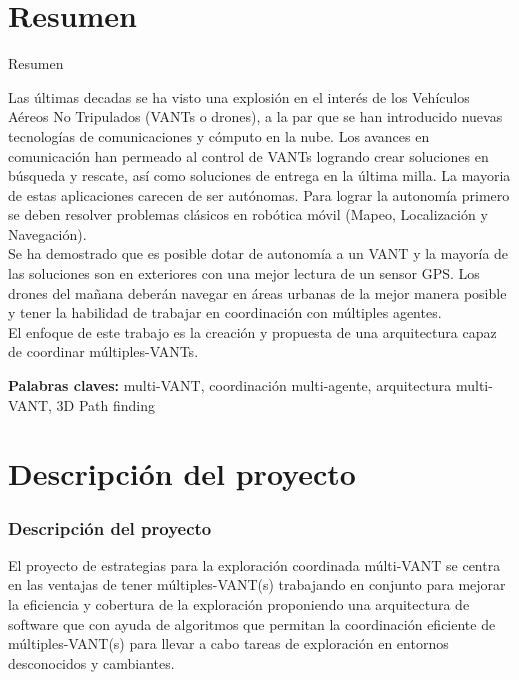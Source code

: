 \documentclass[
	11pt, %
]{beamer}
\begin{document}


\section{Resumen}

\begin{frame}
  
  \begin{block}{Resumen}

    {\footnotesize Las últimas decadas se ha visto una explosión en el interés de los Vehículos Aéreos No Tripulados (VANTs o drones), a la par que se han introducido nuevas tecnologías de comunicaciones y cómputo en la nube. Los avances en comunicación han permeado al control de VANTs logrando crear soluciones en búsqueda y rescate, así como soluciones de entrega en la última milla. La mayoria de estas aplicaciones carecen de ser autónomas. Para lograr la autonomía primero se deben resolver problemas clásicos en robótica móvil (Mapeo, Localización y Navegación).\\
      
    Se ha demostrado que es posible dotar de autonomía a un VANT y la mayoría de las soluciones son en exteriores con una mejor lectura de un sensor GPS. Los drones del mañana deberán navegar en áreas urbanas de la mejor manera posible y tener la habilidad de trabajar en coordinación con múltiples agentes.\\
    
    El enfoque de este trabajo es la creación y propuesta de una arquitectura capaz de coordinar múltiples-VANTs.\\
    }
  \medskip 
  
  \noindent \textbf{Palabras claves:} multi-VANT, coordinación multi-agente, arquitectura multi-VANT, 3D Path finding
  
  \end{block}
  
\end{frame}

\section{Descripción del proyecto}

\begin{frame}
  \frametitle{Descripción del proyecto}

  {\footnotesize
  El proyecto de estrategias para la exploración coordinada múlti-VANT se centra en las ventajas de tener múltiples-VANT(s) trabajando en conjunto para mejorar la eficiencia y cobertura de la exploración proponiendo una arquitectura de software que con ayuda de algoritmos que permitan la coordinación eficiente de múltiples-VANT(s) para llevar a cabo tareas de exploración en entornos desconocidos y cambiantes.}
      
\end{frame}
\end{document}
